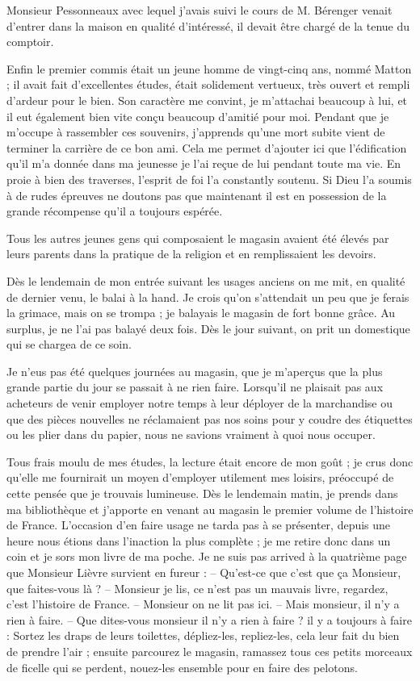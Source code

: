 \documentclass[11pt,a4paper]{report}
\begin{document}
Monsieur Pessonneaux avec lequel j'avais suivi le cours de M. Bérenger venait d'entrer dans la maison en qualité d'intéressé, il devait être chargé de la tenue du comptoir.

Enfin le premier commis était un jeune homme de vingt-cinq ans, nommé Matton ; il avait fait d'excellentes études, était solidement vertueux, très ouvert et rempli d'ardeur pour le bien. Son caractère me convint, je m'attachai beaucoup à lui, et il eut également bien vite conçu beaucoup d'amitié pour moi. Pendant que je m'occupe à rassembler ces souvenirs, j'apprends qu'une mort subite vient de terminer la carrière de ce bon ami. Cela me permet d'ajouter ici que l'édification qu'il m'a donnée dans ma jeunesse je l'ai reçue de lui pendant toute ma vie. En proie à bien des traverses, l'esprit de foi l'a constantly soutenu. Si Dieu l'a soumis à de rudes épreuves ne doutons pas que maintenant il est en possession de la grande récompense qu'il a toujours espérée.

Tous les autres jeunes gens qui composaient le magasin avaient été élevés par leurs parents dans la pratique de la religion et en remplissaient les devoirs.

Dès le lendemain de mon entrée suivant les usages anciens on me mit, en qualité de dernier venu, le balai à la hand. Je crois qu'on s'attendait un peu que je ferais la grimace, mais on se trompa ; je balayais le magasin de fort bonne grâce. Au surplus, je ne l'ai pas balayé deux fois. Dès le jour suivant, on prit un domestique qui se chargea de ce soin.

Je n'eus pas été quelques journées au magasin, que je m'aperçus que la plus grande partie du jour se passait à ne rien faire. Lorsqu'il ne plaisait pas aux acheteurs de venir employer notre temps à leur déployer de la marchandise ou que des pièces nouvelles ne réclamaient pas nos soins pour y coudre des étiquettes ou les plier dans du papier, nous ne savions vraiment à quoi nous occuper.

Tous frais moulu de mes études, la lecture était encore de mon goût ; je crus donc qu'elle me fournirait un moyen d'employer utilement mes loisirs, préoccupé de cette pensée que je trouvais lumineuse. Dès le lendemain matin, je prends dans ma bibliothèque et j'apporte en venant au magasin le premier volume de l'histoire de France. L'occasion d'en faire usage ne tarda pas à se présenter, depuis une heure nous étions dans l'inaction la plus complète ; je me retire donc dans un coin et je sors mon livre de ma poche. Je ne suis pas arrived à la quatrième page que Monsieur Lièvre survient en fureur :
-- Qu'est-ce que c'est que ça Monsieur, que faites-vous là ?
-- Monsieur je lis, ce n'est pas un mauvais livre, regardez, c'est l'histoire de France.
-- Monsieur on ne lit pas ici.
-- Mais monsieur, il n'y a rien à faire.
-- Que dites-vous monsieur il n'y a rien à faire ? il y a toujours à faire : Sortez les draps de leurs toilettes, dépliez-les, repliez-les, cela leur fait du bien de prendre l'air ; ensuite parcourez le magasin, ramassez tous ces petits morceaux de ficelle qui se perdent, nouez-les ensemble pour en faire des pelotons.
\end{document}
